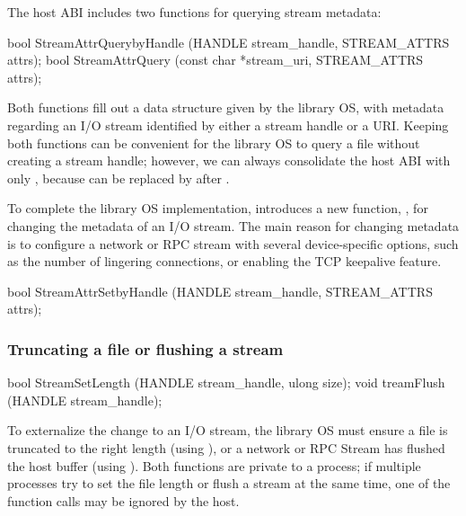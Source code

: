 The host ABI includes two functions for querying stream metadata:

\begin{paldef}
bool StreamAttrQuerybyHandle (HANDLE stream_handle,
                              STREAM_ATTRS attrs);
bool StreamAttrQuery (const char *stream_uri,
                      STREAM_ATTRS attrs);

\end{paldef}

Both functions fill out a data structure given by the library OS,
with metadata regarding an I/O stream
identified by either a stream handle or a URI.
Keeping both functions can be convenient for the library OS to query a file without creating a stream handle;
however, we can always consolidate the host ABI
with only ,
because  can be replaced by 
after .


To complete the library OS implementation, \graphene{} introduces a new function,
,
for changing the metadata of an I/O stream.
The main reason for changing metadata
is to configure a network or RPC stream with several device-specific options,
such as the number of lingering connections,
or enabling the TCP keepalive feature.









\begin{paldef}
bool StreamAttrSetbyHandle (HANDLE stream_handle,
                            STREAM_ATTRS attrs);
\end{paldef}


\subsubsection*{Truncating a file or flushing a stream}


\begin{paldef}
bool StreamSetLength (HANDLE stream_handle, ulong size);
void treamFlush (HANDLE stream_handle);
\end{paldef}


To externalize the change to an I/O stream, the library OS must ensure a file is truncated to the right length (using ), or a network or RPC Stream has flushed the host buffer (using ).
Both functions are private to a process; if multiple processes try
to set the file length or flush a stream at the same time, one of the function calls may be ignored by the host.






